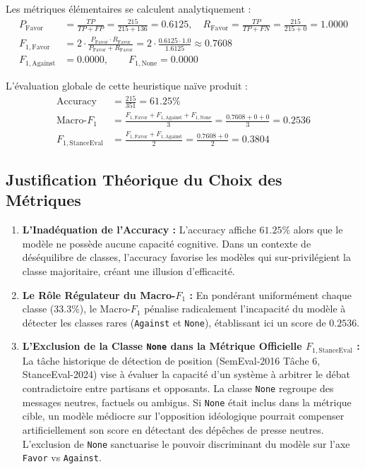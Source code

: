 \documentclass[11pt,a4paper]{article}
\begin{document}
Les métriques élémentaires se calculent analytiquement :
\begin{align}
    P_{\text{Favor}} &= \frac{TP}{TP + FP} = \frac{215}{215 + 136} = \mathbf{0.6125}, \quad R_{\text{Favor}} = \frac{TP}{TP + FN} = \frac{215}{215 + 0} = \mathbf{1.0000} \\
    F_{1,\text{Favor}} &= 2 \cdot \frac{P_{\text{Favor}} \cdot R_{\text{Favor}}}{P_{\text{Favor}} + R_{\text{Favor}}} = 2 \cdot \frac{0.6125 \cdot 1.0}{1.6125} \approx \mathbf{0.7608} \\
    F_{1,\text{Against}} &= \mathbf{0.0000}, \qquad F_{1,\text{None}} = \mathbf{0.0000}
\end{align}

L'évaluation globale de cette heuristique naïve produit :
\begin{align}
    \text{Accuracy} &= \frac{215}{351} = \mathbf{61.25\%} \\
    \text{Macro-}F_1 &= \frac{F_{1,\text{Favor}} + F_{1,\text{Against}} + F_{1,\text{None}}}{3} = \frac{0.7608 + 0 + 0}{3} = \mathbf{0.2536} \\
    F_{1,\text{StanceEval}} &= \frac{F_{1,\text{Favor}} + F_{1,\text{Against}}}{2} = \frac{0.7608 + 0}{2} = \mathbf{0.3804}
\end{align}

\subsection{Justification Théorique du Choix des Métriques}
\begin{enumerate}
    \item \textbf{L'Inadéquation de l'Accuracy :} L'accuracy affiche $61.25\%$ alors que le modèle ne possède aucune capacité cognitive. Dans un contexte de déséquilibre de classes, l'accuracy favorise les modèles qui sur-privilégient la classe majoritaire, créant une illusion d'efficacité.
    \item \textbf{Le Rôle Régulateur du Macro-$F_1$ :} En pondérant uniformément chaque classe ($33.3\%$), le Macro-$F_1$ pénalise radicalement l'incapacité du modèle à détecter les classes rares (\texttt{Against} et \texttt{None}), établissant ici un score de $0.2536$.
    \item \textbf{L'Exclusion de la Classe \texttt{None} dans la Métrique Officielle $F_{1,\text{StanceEval}}$ :} 
    La tâche historique de détection de position (SemEval-2016 Tâche 6, StanceEval-2024) vise à évaluer la capacité d'un système à arbitrer le débat contradictoire entre partisans et opposants. La classe \texttt{None} regroupe des messages neutres, factuels ou ambigus. Si \texttt{None} était inclus dans la métrique cible, un modèle médiocre sur l'opposition idéologique pourrait compenser artificiellement son score en détectant des dépêches de presse neutres. L'exclusion de \texttt{None} sanctuarise le pouvoir discriminant du modèle sur l'axe \texttt{Favor} vs \texttt{Against}.
\end{enumerate}
\end{document}
